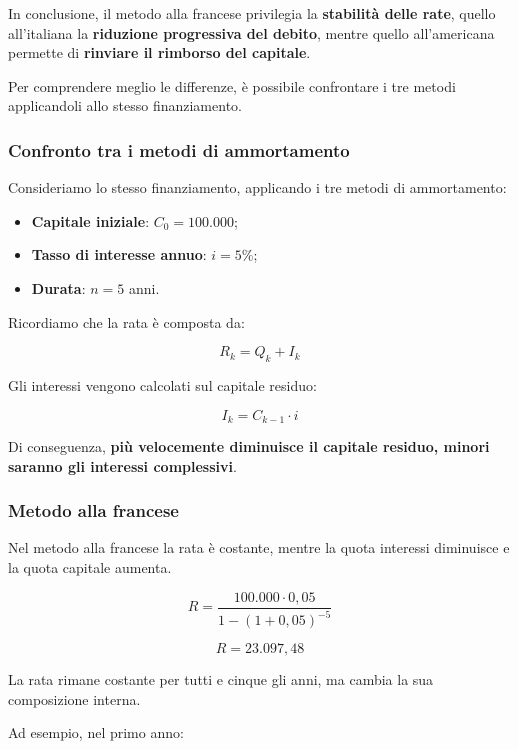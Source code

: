 \noindent In conclusione, il metodo alla francese privilegia la
\textbf{stabilità delle rate}, quello all'italiana la
\textbf{riduzione progressiva del debito}, mentre quello
all'americana permette di \textbf{rinviare il rimborso del capitale}.

\medskip

\noindent Per comprendere meglio le differenze, è possibile confrontare i tre metodi applicandoli allo stesso finanziamento.

\subsubsection*{Confronto tra i metodi di ammortamento}

\noindent Consideriamo lo stesso finanziamento, applicando i tre metodi di ammortamento:

\begin{itemize}
    \item \textbf{Capitale iniziale}: $C_0 = 100.000$;
    \item \textbf{Tasso di interesse annuo}: $i = 5\%$;
    \item \textbf{Durata}: $n = 5$ anni.
\end{itemize}

\noindent Ricordiamo che la rata è composta da:

\[
R_k = Q_k + I_k
\]

\noindent Gli interessi vengono calcolati sul capitale residuo:

\[
I_k = C_{k-1} \cdot i
\]

\noindent Di conseguenza, \textbf{più velocemente diminuisce il capitale residuo, minori saranno gli interessi complessivi}.

\subsubsection*{Metodo alla francese}

\noindent Nel metodo alla francese la rata è costante, mentre la quota interessi diminuisce e la quota capitale aumenta.

\[
R = \frac{100.000 \cdot 0{,}05}
{1-(1+0{,}05)^{-5}}
\]

\[
\boxed{R = 23.097{,}48}
\]

\noindent La rata rimane costante per tutti e cinque gli anni, ma cambia la sua composizione interna.

\medskip

\noindent Ad esempio, nel primo anno:

